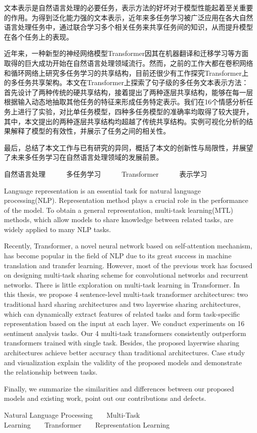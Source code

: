 \begin{cabstract}
	文本表示是自然语言处理的必要任务，表示方法的好坏对于模型性能起着至关重要的作用。为得到泛化能力强的文本表示，近年来多任务学习被广泛应用在各大自然语言处理任务中，通过联合学习多个相关任务来共享任务间的知识，从而提升模型在各个任务上的表现。
	
	近年来，一种新型的神经网络模型Transformer因其在机器翻译和迁移学习等方面取得的巨大成功开始在自然语言处理领域流行。然而，之前的工作大都在卷积网络和循环网络上研究多任务学习的共享结构，目前还很少有工作探究Transformer上的多任务共享架构。本文在Transformer上探索了句子级的多任务文本表示方法：首先设计了两种传统的硬共享结构，接着提出了两种逐层共享结构，能够在每一层根据输入动态地抽取其他任务的特征来形成任务特定表示。我们在16个情感分析任务上进行了实验，对比单任务模型，四种多任务模型的准确率均取得了较大提升，其中，本文提出的两种逐层共享结构均超越了传统共享结构。实例可视化分析的结果解释了模型的有效性，并展示了任务之间的相关性。
	
	最后，总结了本文工作与已有研究的异同，概括了本文的创新性与局限性，并展望了未来多任务学习在自然语言处理领域的发展前景。
\end{cabstract}


\begin{ckeywords}
	自然语言处理\ \ \ \ \ \ 多任务学习\ \ \ \ \ \ Transformer\ \ \ \ \ \ 表示学习
\end{ckeywords}



\begin{eabstract}
	Language representation is an essential task for natural language processing(NLP). Representation method plays a crucial role in the performance of the model. To obtain a general representation, multi-task learning(MTL) methods, which allow models to share knowledge between related tasks, are widely applied to many NLP tasks.
	
	Recently, Transformer, a novel neural network based on self-attention mechanism, has become popular in the field of NLP due to its great success in machine translation and transfer learning. However, most of the previous work has focused on designing multi-task sharing scheme for convolutional networks and recurrent networks. There is little exploration on multi-task learning in Transformer. In this thesis, we propose 4 sentence-level multi-task transformer architectures: two traditional hard sharing architectures and two layerwise sharing architectures, which can dynamically extract features of related tasks and form task-specific representation based on the input at each layer. We conduct experiments on 16 sentiment analysis tasks. Our 4 multi-task transformers consistently outperform transformers trained with single task. Besides, the proposed layerwise sharing architectures achieve better accuracy than traditional architectures. Case study and visualization explain the validity of the proposed models and demonstrate the relationship between tasks.
	
	Finally, we summarize the similarities and differences between our proposed models and existing work, point out our contributions and defects.
	
\end{eabstract}


\begin{ekeywords}
	Natural Language Processing\ \ \ \ Multi-Task Learning\ \ \ \ Transformer\ \ \ \ Representation Learning
\end{ekeywords}

